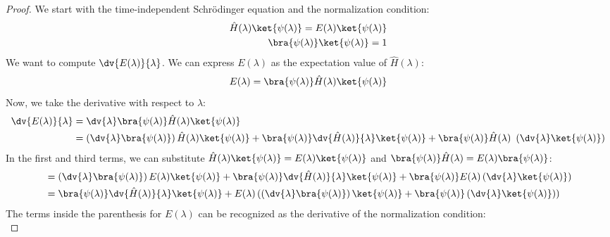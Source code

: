\begin{proof}
    We start with the time-independent Schrödinger equation and the
    normalization condition:
    \begin{align} \label{eq:schrodinger_normalization}
        \hat H(\lambda)\ket{\psi(\lambda)} = E(\lambda)\ket{\psi(\lambda)} \\
        \bra{\psi(\lambda)}\ket{\psi(\lambda)} = 1 \notag
    \end{align}
    We want to compute $\dv{E(\lambda)}{\lambda}$. We can express
    $E(\lambda)$ as the expectation value of $\hat H(\lambda)$:
    \begin{equation}
        E(\lambda) = \bra{\psi(\lambda)}\hat H(\lambda)\ket{\psi(\lambda)}
    \end{equation}
    Now, we take the derivative with respect to $\lambda$:
    \begin{align} \label{eq:feynman_hellman_derivation_step1}
        \dv{E(\lambda)}{\lambda} &=
        \dv{\lambda}\bra{\psi(\lambda)}\hat H(\lambda)\ket{\psi(\lambda)} \\
        &= \left(\dv{\lambda} \bra{\psi(\lambda)}\right)\hat
        H(\lambda)\ket{\psi(\lambda)} + \bra{\psi(\lambda)} \dv{\hat
        H(\lambda)}{\lambda} \ket{\psi(\lambda)} +
        \bra{\psi(\lambda)}\hat H(\lambda)\ \left(\dv{\lambda}
        \ket{\psi(\lambda)}\right) \notag
    \end{align}
    In the first and third terms, we can substitute $\hat
    H(\lambda)\ket{\psi(\lambda)} = E(\lambda)\ket{\psi(\lambda)}$
    and $\bra{\psi(\lambda)}\hat H(\lambda) = E(\lambda)\bra{\psi(\lambda)}$:
    \begin{align} \label{eq:feynman_hellman_derivation_step2}
        &= \left(\dv{\lambda} \bra{\psi(\lambda)}\right) E(\lambda)
        \ket{\psi(\lambda)} + \bra{\psi(\lambda)} \dv{\hat
        H(\lambda)}{\lambda} \ket{\psi(\lambda)} +
        \bra{\psi(\lambda)} E(\lambda) \left(\dv{\lambda}
        \ket{\psi(\lambda)}\right) \\
        &= \bra{\psi(\lambda)} \dv{\hat H(\lambda)}{\lambda}
        \ket{\psi(\lambda)} + E(\lambda) \left(\left(\dv{\lambda}
            \bra{\psi(\lambda)}\right) \ket{\psi(\lambda)} +
            \bra{\psi(\lambda)} \left(\dv{\lambda}
        \ket{\psi(\lambda)}\right) \right) \notag
    \end{align}
    The terms inside the parenthesis for $E(\lambda)$ can be
    recognized as the derivative of the normalization condition:
    \begin{equation} \label{eq:feynman_hellman_normalization_deriv}

\end{equation}
\end{proof}
